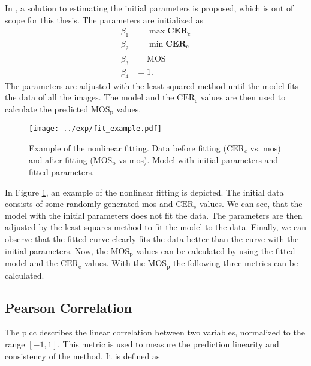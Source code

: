 In \cite{nonlin_fit_init_proof_2017}, a solution to estimating the initial parameters is proposed, which is out of scope for this thesis.
The parameters are initialized as
\begin{equation}
    \begin{aligned}
        \beta_{1} &= \max{\mathbf{CER}_{\text{c}}} \\
        \beta_{2} &= \min{\mathbf{CER}_{\text{c}}} \\
        \beta_{3} &= \overline{\text{MOS}} \\
        \beta_{4} &= 1.
    \end{aligned}
    \label{eq:nonlinear_init}
\end{equation}
The parameters are adjusted with the least squared method \cite{least_squares_1978} until the model fits the data of all the images.
The model and the $\text{CER}_{\text{c}}$ values are then used to calculate the predicted $\text{MOS}_{\text{p}}$ values.

\begin{figure}[h]
    \centering
    \texttt{[image: ../exp/fit\_example.pdf]}
    \caption{Example of the nonlinear fitting. Data before fitting ($\text{CER}_{c}$ vs. \gls{mos}) and after fitting ($\text{MOS}_{\text{p}}$ vs \gls{mos}). Model with initial parameters and fitted parameters.}
    \label{fig:nonlinear_fit}
\end{figure}

In Figure \ref{fig:nonlinear_fit}, an example of the nonlinear fitting is depicted.
The initial data consists of some randomly generated \gls{mos} and $\text{CER}_{\text{c}}$ values.
We can see, that the model with the initial parameters does not fit the data.
The parameters are then adjusted by the least squares method \cite{least_squares_1978} to fit the model to the data.
Finally, we can observe that the fitted curve clearly fits the data better than the curve with the initial parameters.
Now, the $\text{MOS}_{\text{p}}$ values can be calculated by using the fitted model and the $\text{CER}_{\text{c}}$ values.
With the $\text{MOS}_{\text{p}}$ the following three metrics \cite{iqa_survey_2021} can be calculated.

\subsection{Pearson Correlation}
\label{subsec:pearson}

The \gls{plcc} \cite{pears_spear_2016} describes the linear correlation between two variables, normalized to the range $[-1, 1]$.
This metric is used to measure the prediction linearity and consistency of the method.
It is defined as

